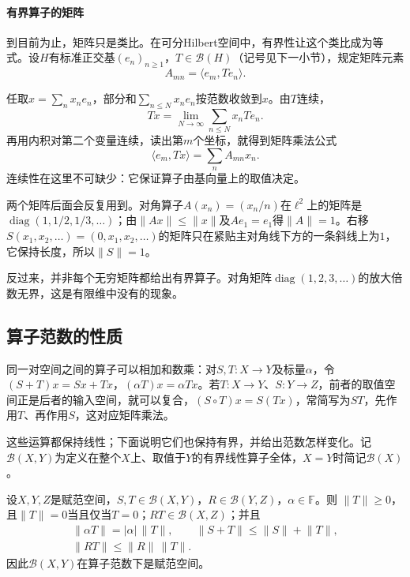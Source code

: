 \paragraph{有界算子的矩阵}
到目前为止，矩阵只是类比。在可分Hilbert空间中，有界性让这个类比成为等式。设$H$有标准正交基$(e_n)_{n\geq1}$，$T\in\mathcal B(H)$（记号见下一小节），规定矩阵元素
\begin{equation}
 A_{mn}=\langle e_m,Te_n\rangle .
 \label{eq:lop-matrix-entry}
\end{equation}

任取$x=\sum_nx_ne_n$，部分和$\sum_{n\leq N}x_ne_n$按范数收敛到$x$。由$T$连续，
\[
 Tx=\lim_{N\to\infty}\sum_{n\leq N}x_nTe_n.
\]
再用内积对第二个变量连续，读出第$m$个坐标，就得到矩阵乘法公式
\[
 \langle e_m,Tx\rangle=\sum_nA_{mn}x_n .
\]
连续性在这里不可缺少：它保证算子由基向量上的取值决定。

两个矩阵后面会反复用到。对角算子$A(x_n)=(x_n/n)$在$\ell^2$上的矩阵是$\operatorname{diag}(1,1/2,1/3,\ldots)$；由$\lVert Ax\rVert\leq\lVert x\rVert$及$Ae_1=e_1$得$\lVert A\rVert=1$。右移$S(x_1,x_2,\ldots)=(0,x_1,x_2,\ldots)$的矩阵只在紧贴主对角线下方的一条斜线上为$1$，它保持长度，所以$\lVert S\rVert=1$。

反过来，并非每个无穷矩阵都给出有界算子。对角矩阵$\operatorname{diag}(1,2,3,\ldots)$的放大倍数无界，这是有限维中没有的现象。

\subsection{算子范数的性质}
\label{sec:lop-norm-properties}

同一对空间之间的算子可以相加和数乘：对$S,T:X\to Y$及标量$\alpha$，令$(S+T)x=Sx+Tx$，$(\alpha T)x=\alpha Tx$。若$T:X\to Y$、$S:Y\to Z$，前者的取值空间正是后者的输入空间，就可以复合，$(S\circ T)x=S(Tx)$，常简写为$ST$，先作用$T$、再作用$S$，这对应矩阵乘法。

这些运算都保持线性；下面说明它们也保持有界，并给出范数怎样变化。记$\mathcal B(X,Y)$为定义在整个$X$上、取值于$Y$的有界线性算子全体，$X=Y$时简记$\mathcal B(X)$。

\begin{theorem}[算子范数的基本性质]
\label{thm:lop-norm-properties}
设$X,Y,Z$是赋范空间，$S,T\in\mathcal B(X,Y)$，$R\in\mathcal B(Y,Z)$，$\alpha\in\mathbb F$。则
$\lVert T\rVert\geq0$，且$\lVert T\rVert=0$当且仅当$T=0$；$RT\in\mathcal B(X,Z)$；并且
\begin{equation}
 \begin{gathered}
 \lVert\alpha T\rVert=\lvert\alpha\rvert\,\lVert T\rVert,\qquad
 \lVert S+T\rVert\leq\lVert S\rVert+\lVert T\rVert,\\
 \lVert RT\rVert\leq\lVert R\rVert\,\lVert T\rVert.
 \end{gathered}
 \label{eq:lop-norm-properties}
\end{equation}
因此$\mathcal B(X,Y)$在算子范数下是赋范空间。
\end{theorem}

